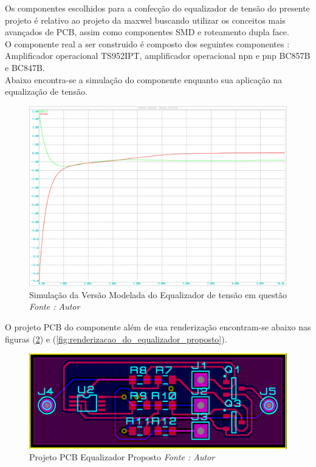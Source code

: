 \documentclass[11pt, a4paper, oneside]{article}
\begin{document}
Os componentes escolhidos para a confecção do equalizador de tensão do presente projeto é relativo ao projeto da maxwel buscando utilizar os conceitos mais
avançados de PCB, assim como componentes SMD e roteamento dupla face.\\
O componente real a ser construido é composto dos seguintes componentes : Amplificador operacional TS952IPT, amplificador operacional npn e pnp BC857B e BC847B.\\
Abaixo encontra-se a simulação do componente enquanto sua aplicação na equalização de tensão.
\begin{figure}[h!]
\centering
\includegraphics[width=0.9\linewidth]{simulacao_dipositivo_a_ser_construido}
\caption{Simulação da Versão Modelada do Equalizador de tensão em questão \textit{Fonte : Autor}}
\label{fig:topologia_dos_equlizadores_utilizados_no_presente_trabalho}
\end{figure}

O projeto PCB do componente além de sua renderização encontram-se abaixo nas figuras (\ref{Projeto_pcb_do_equalizador_proposto}) e (\ref{fig:renderizacao_do_equalizador_proposto}).

\begin{figure}[h!]
\centering
\includegraphics[width=1\linewidth]{equalizer_project}
\caption{Projeto PCB Equalizador Proposto \textit{Fonte : Autor}}
\label{Projeto_pcb_do_equalizador_proposto}
\end{figure}
\end{document}
